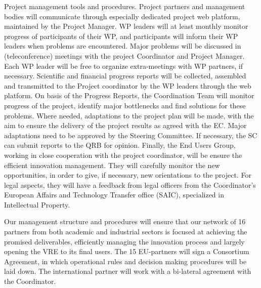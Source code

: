 Project management tools and procedures.
Project partners and management bodies will communicate through especially dedicated project web platform, 
maintained by the Project Manager. WP leaders will at least monthly monitor progress of participants of their WP,
and participants will inform their WP leaders when problems are encountered. Major problems will be discussed in 
(teleconference) meetings with the project Coordinator and Project Manager. Each WP leader will be free to organize 
extra-meetings with WP partners, if necessary. Scientific and financial progress reports will be collected, assembled
and transmitted to the Project coordinator by the WP leaders through the web platform. On basis of the Progress 
Reports, the Coordination Team  will monitor progress of the project, identify major bottlenecks and find solutions 
for these problems. Where needed, adaptations to the project plan will be made, with the aim to ensure the delivery of 
the project results as agreed with the EC. Major adaptations need to be approved by the Steering Committee. 
If necessary, the SC can submit reports to the QRB for opinion. 
Finally, the End Users Group, working in close cooperation with the project coordinator, will be ensure the efficient 
innovation management. They will carefully monitor the new opportunities, in order to give, if necessary, new 
orientations to the project. For legal aspects, they will have a feedback from legal officers from the Coordinator’s 
European Affairs and Technology Transfer office (SAIC), specialized in Intellectual Property.

Our management structure and procedures will ensure that our network of 16 partners from both academic and industrial
sectors is focused at achieving the promised deliverables, efficiently managing the innovation process and largely 
opening the VRE to its final users. The 15 EU-partners will sign a Consortium Agreement, in which operational rules 
and decision making procedures will be laid down. The international partner will work with a bi-lateral agreement with 
the Coordinator.
















